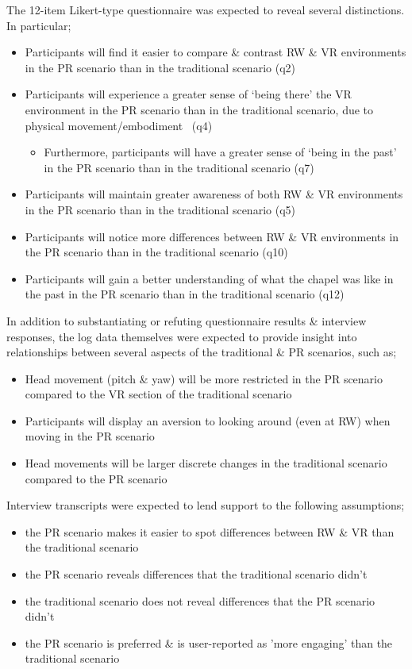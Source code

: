 The 12-item Likert-type questionnaire was expected to reveal several distinctions. In particular;
\begin{itemize}
	\item Participants will find it easier to compare \& contrast RW \& VR environments in the PR scenario than in the traditional scenario (q2)
	\item Participants will experience a greater  sense of `being there' the VR environment in the PR scenario than in the traditional scenario, due to physical movement/embodiment~\cite{Groten2011} (q4)
	\begin{itemize}
		\item Furthermore, participants will have a greater sense of `being in the past' in the PR scenario than in the traditional scenario (q7)
	\end{itemize}
	\item Participants will maintain greater awareness of both RW \& VR environments in the PR scenario than in the traditional scenario (q5)
	\item Participants will notice more differences between RW \& VR environments in the PR scenario than in the traditional scenario (q10)	
	\item Participants will gain a better understanding of what the chapel was like in the past in the PR scenario than in the traditional scenario (q12)
\end{itemize}

In addition to substantiating or refuting questionnaire results \& interview responses, the log data themselves were expected to provide insight into relationships between several aspects of the traditional \& PR scenarios, such as;
\begin{itemize}
	\item Head movement (pitch \& yaw) will be more restricted in the PR scenario compared to the VR section of the traditional scenario
	\item Participants will display an aversion to looking around (even at RW) when moving in the PR scenario
	\item Head movements will be larger discrete changes in the traditional scenario compared to the PR scenario
\end{itemize}

Interview transcripts were expected to lend support to the following assumptions;
\begin{itemize}
	\item the PR scenario makes it easier to spot differences between RW \& VR than the traditional scenario
	\item the PR scenario reveals differences that the traditional scenario didn't
	\item the traditional scenario does not reveal differences that the PR scenario didn't
	\item the PR scenario is preferred \& is user-reported as 'more engaging' than the traditional scenario
\end{itemize}

